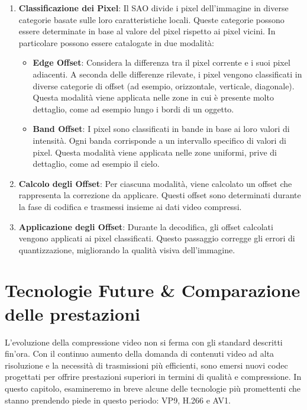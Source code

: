 \documentclass[a4paper,12pt, oneside]{article}
\begin{document}
\begin{enumerate}
    \item \textbf{Classificazione dei Pixel}: Il SAO divide i pixel dell'immagine in diverse categorie basate
    sulle loro caratteristiche locali. Queste categorie possono essere determinate in base al valore del pixel
    rispetto ai pixel vicini. In particolare possono essere catalogate in due modalità:
    
    \begin{itemize}
        \item \textbf{Edge Offset}: Considera la differenza tra il pixel corrente e i suoi pixel adiacenti.
        A seconda delle differenze rilevate, i pixel vengono classificati in diverse categorie di offset (ad
        esempio, orizzontale, verticale, diagonale). Questa modalità viene applicata nelle zone in cui è
        presente molto dettaglio, come ad esempio lungo i bordi di un oggetto.
        \item \textbf{Band Offset}: I pixel sono classificati in bande in base ai loro valori di intensità.
        Ogni banda corrisponde a un intervallo specifico di valori di pixel. Questa modalità viene applicata
        nelle zone uniformi, prive di dettaglio, come ad esempio il cielo.
    \end{itemize}
    
    \item \textbf{Calcolo degli Offset}: Per ciascuna modalità, viene calcolato un offset che rappresenta la
    correzione da applicare. Questi offset sono determinati durante la fase di codifica e trasmessi insieme
    ai dati video compressi.
    \item \textbf{Applicazione degli Offset}: Durante la decodifica, gli offset calcolati vengono applicati
    ai pixel classificati. Questo passaggio corregge gli errori di quantizzazione, migliorando la qualità
    visiva dell'immagine.
\end{enumerate}

\section{Tecnologie Future \& Comparazione delle prestazioni}
L'evoluzione della compressione video non si ferma con gli standard descritti fin'ora. Con il continuo
aumento della domanda di contenuti video ad alta risoluzione e la necessità di trasmissioni più efficienti,
sono emersi nuovi codec progettati per offrire prestazioni superiori in termini di qualità e compressione.
In questo capitolo, esamineremo in breve alcune delle tecnologie più promettenti che stanno prendendo piede
in questo periodo: VP9, H.266 e AV1.
\end{document}
